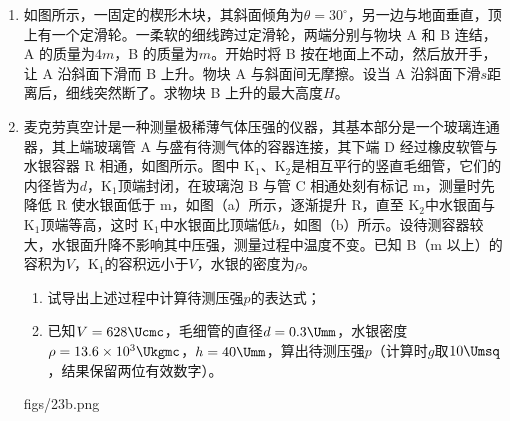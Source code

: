 \documentclass[\gkver]{gaokaozhenti}
\begin{document}
\begin{enumerate}
\item
如图所示，一固定的楔形木块，其斜面倾角为$\theta=30^{\circ}$，另一边与地面垂直，顶上有一个定滑轮。一柔软的细线跨过定滑轮，两端分别与物块 A 和 B 连结，A 的质量为$4m$，B 的质量为$m$。开始时将 B 按在地面上不动，然后放开手，让 A 沿斜面下滑而 B 上升。物块 A 与斜面间无摩擦。设当 A 沿斜面下滑$s$距离后，细线突然断了。求物块 B 上升的最大高度$H$。

\item
麦克劳真空计是一种测量极稀薄气体压强的仪器，其基本部分是一个玻璃连通器，其上端玻璃管 A 与盛有待测气体的容器连接，其下端 D 经过橡皮软管与水银容器 R 相通，如图所示。图中 K$_{1}$、K$_{2}$是相互平行的竖直毛细管，它们的内径皆为$d$，K$_{1}$顶端封闭，在玻璃泡 B 与管 C 相通处刻有标记 m，测量时先降低 R 使水银面低于 m，如图（a）所示，逐渐提升 R，直至 K$_{2}$中水银面与 K$_{1}$顶端等高，这时 K$_{1}$中水银面比顶端低$h$，如图（b）所示。设待测容器较大，水银面升降不影响其中压强，测量过程中温度不变。已知 B（m 以上）的容积为$V$，K$_{1}$的容积远小于$V$，水银的密度为$\rho$。
\begin{enumerate}
	\item
	试导出上述过程中计算待测压强$p$的表达式；
	\item
	已知$V=628\Ucmc$，毛细管的直径$d=0.3\Umm$，水银密度$\rho=13.6\times10^{3}\Ukgmc$，$h=40\Umm$，算出待测压强$p$（计算时$g$取$10\Umsq$，结果保留两位有效数字）。
\end{enumerate}
{figs/23b.png}
\end{enumerate}
\end{document}
